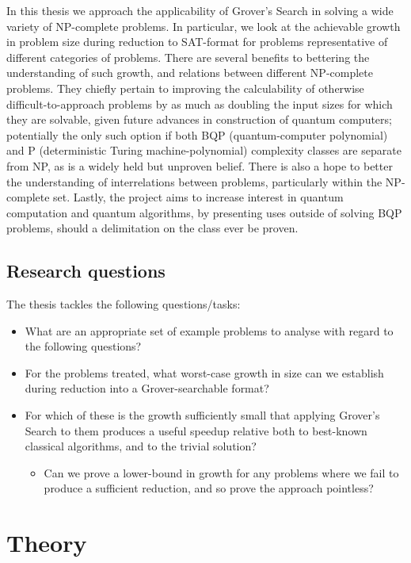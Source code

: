\documentclass[msc,lith,english]{liuthesis}
\begin{document}
In this thesis we approach the applicability of Grover's Search in solving a wide variety of NP-complete problems. In particular, we look at the achievable growth in problem size during reduction to SAT-format for problems representative of different categories of problems. There are several benefits to bettering the understanding of such growth, and relations between different NP-complete problems. They chiefly pertain to improving the calculability of otherwise difficult-to-approach problems by as much as doubling the input sizes for which they are solvable, given future advances in construction of quantum computers; potentially the only such option if both BQP (quantum-computer polynomial) and P (deterministic Turing machine-polynomial) complexity classes are separate from NP, as is a widely held but unproven belief. There is also a hope to better the understanding of interrelations between problems, particularly within the NP-complete set. Lastly, the project aims to increase interest in quantum computation and quantum algorithms, by presenting uses outside of solving BQP problems, should a delimitation on the class ever be proven.

\section{Research questions}
The thesis tackles the following questions/tasks:
\begin{itemize}
    \item What are an appropriate set of example problems to analyse with regard to the following questions?
    \item For the problems treated, what worst-case growth in size can we establish during reduction into a Grover-searchable format?
    \item For which of these is the growth sufficiently small that applying Grover's Search to them produces a useful speedup relative both to best-known classical algorithms, and to the trivial solution?
    \begin{itemize}
        \item Can we prove a lower-bound in growth for any problems where we fail to produce a sufficient reduction, and so prove the approach pointless?
    \end{itemize}
\end{itemize}

\chapter{Theory}
\end{document}
